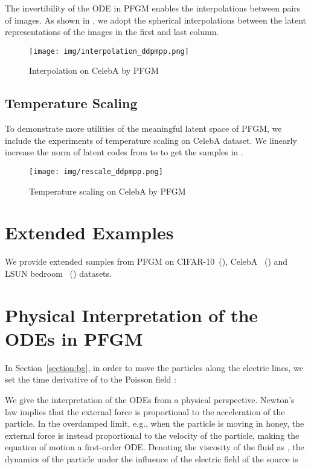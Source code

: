 The invertibility of the ODE in PFGM enables the interpolations between pairs of images. As shown in , we adopt the spherical interpolations between the latent representations of the images in the first and last column.

\begin{figure}[htbp]
    \centering
    \texttt{[image: img/interpolation\_ddpmpp.png]}
     \caption{Interpolation on CelebA  by PFGM}\label{fig:interpolation}
\end{figure}

\subsection{Temperature Scaling}
\label{app:temp}

To demonstrate more utilities of the meaningful latent space of PFGM, we include the experiments of temperature scaling on CelebA  dataset. We linearly increase the norm of latent codes from  to  to get the samples in .
\begin{figure}[htbp]
    \centering
    \texttt{[image: img/rescale\_ddpmpp.png]}
    \caption{Temperature scaling on CelebA  by PFGM}
    \label{fig:temperature}
\end{figure}

\section{Extended Examples}
\label{app:samples}
We provide extended samples from PFGM on CIFAR-10~(), CelebA ~() and {LSUN bedroom ~() datasets.}


\section{Physical Interpretation of the ODEs in PFGM}\label{app:honey}

{In Section~\ref{section:bg}, in order to move the particles along the electric lines, we set the time derivative of  to the Poisson field :}

{{We give the interpretation of the ODEs from a physical perspective. Newton's law implies that the external force is proportional to the acceleration of the particle. In the overdamped limit, e.g., when the particle is moving in honey, the external force is instead proportional to the velocity of the particle, making the equation of motion a first-order ODE.} 
Denoting the viscosity of the fluid as , the dynamics of the particle under the influence of the electric field of the source  is}

